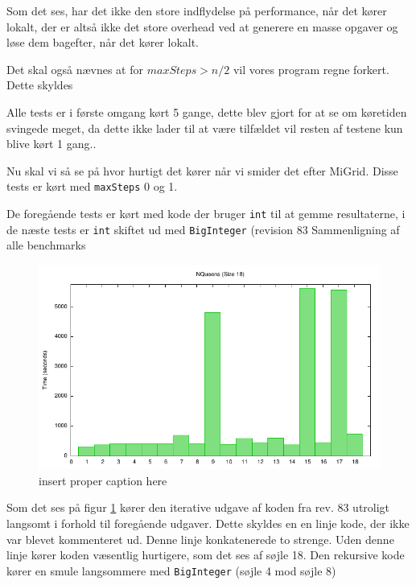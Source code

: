 Som det ses, har det ikke den store indflydelse på performance, når det kører
lokalt, der er altså ikke det store overhead ved at generere en masse opgaver og
løse dem bagefter, når det kører lokalt. 

Det skal også nævnes at for $maxSteps>n/2$ vil vores program regne forkert.
Dette skyldes 


Alle tests er i første omgang kørt 5 gange, dette blev gjort for at se om
køretiden svingede meget, da dette ikke lader til at være tilfældet vil resten
af testene kun blive kørt 1 gang.. 

Nu skal vi så se på hvor hurtigt det kører når vi smider det efter MiGrid. 
Disse tests er kørt med \texttt{maxSteps} 0 og 1.

De foregående tests er kørt med kode der bruger \texttt{int} til at gemme resultaterne,
i de næste tests er \texttt{int} skiftet ud med \texttt{BigInteger} (revision
83
\clearpage
Sammenligning af alle benchmarks

\begin{figure}[h]
\begin{center}
\includegraphics{../benchmarks/b3.pdf}
\caption{insert proper caption here } 
\label{plot:b3}
\end{center}
\end{figure}

Som det ses på figur \ref{plot:b3} kører den iterative udgave af koden fra
rev. 83 utroligt langsomt i forhold til foregående udgaver. 
Dette skyldes en en linje kode, der ikke var blevet kommenteret ud. Denne linje
konkatenerede to strenge. Uden denne linje kører koden væsentlig hurtigere, som
det ses af søjle 18. Den rekursive kode kører en smule langsommere med
\texttt{BigInteger} (søjle 4 mod søjle 8)

